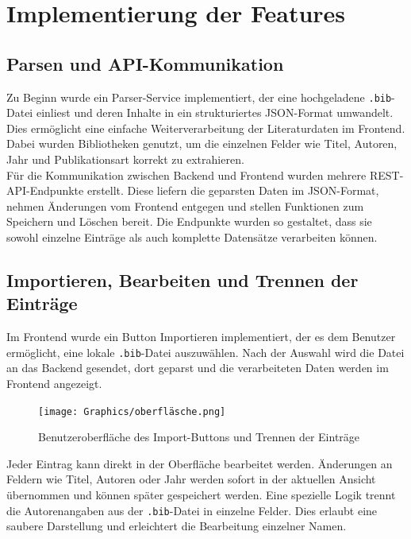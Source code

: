 \section{Implementierung der Features}

\subsection{Parsen und API-Kommunikation}
Zu Beginn wurde ein Parser-Service implementiert, der eine hochgeladene \texttt{.bib}-Datei einliest 
und deren Inhalte in ein strukturiertes JSON-Format umwandelt. Dies ermöglicht eine einfache Weiterverarbeitung 
der Literaturdaten im Frontend. Dabei wurden Bibliotheken genutzt, um die einzelnen Felder wie Titel, Autoren, Jahr
und Publikationsart korrekt zu extrahieren.\\

\noindent Für die Kommunikation zwischen Backend und Frontend wurden mehrere REST-API-Endpunkte erstellt.
Diese liefern die geparsten Daten im JSON-Format, nehmen Änderungen vom Frontend entgegen und
stellen Funktionen zum Speichern und Löschen bereit. Die Endpunkte wurden so gestaltet, dass sie sowohl
einzelne Einträge als auch komplette Datensätze verarbeiten können.

\subsection{Importieren, Bearbeiten und Trennen der Einträge}
Im Frontend wurde ein Button \glqq Importieren\grqq{} implementiert, der es dem Benutzer ermöglicht,
eine lokale \texttt{.bib}-Datei auszuwählen. Nach der Auswahl wird die Datei an das Backend gesendet, 
dort geparst und die verarbeiteten Daten werden im Frontend angezeigt.

\begin{figure}[h]
    \centering
    \texttt{[image: Graphics/oberfläsche.png]}
    \caption{Benutzeroberfläche des Import-Buttons und Trennen der Einträge}
    \label{fig:importieren}
\end{figure}

\noindent Jeder Eintrag kann direkt in der Oberfläche bearbeitet werden. Änderungen an Feldern wie Titel,
Autoren oder Jahr werden sofort in der aktuellen Ansicht übernommen und können später gespeichert werden.
Eine spezielle Logik trennt die Autorenangaben aus der \texttt{.bib}-Datei in einzelne Felder.
Dies erlaubt eine saubere Darstellung und erleichtert die Bearbeitung einzelner Namen.

